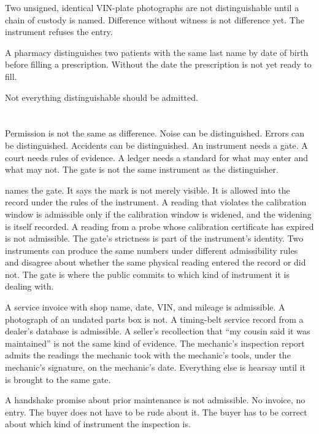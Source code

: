 Two unsigned, identical VIN-plate photographs are not distinguishable until
a chain of custody is named. Difference without witness is not difference
yet. The instrument refuses the entry.

A pharmacy distinguishes two patients with the same last name by date of
birth before filling a prescription. Without the date the prescription is
not yet ready to fill.

Not everything distinguishable should be admitted.

\section{}
\label{se:admissible}

Permission is not the same as difference. Noise can be distinguished. Errors
can be distinguished. Accidents can be distinguished. An instrument needs a
gate. A court needs rules of evidence. A ledger needs a standard for what
may enter and what may not. The gate is not the same instrument as the
distinguisher.

 names the gate. It says the mark is not merely visible. It
is allowed into the record under the rules of the instrument. A reading that
violates the calibration window is admissible only if the calibration window
is widened, and the widening is itself recorded. A reading from a probe
whose calibration certificate has expired is not admissible. The gate's
strictness is part of the instrument's identity. Two instruments can produce
the same numbers under different admissibility rules and disagree about
whether the same physical reading entered the record or did not. The gate is
where the public commits to which kind of instrument it is dealing with.

A service invoice with shop name, date, VIN, and mileage is admissible. A
photograph of an undated parts box is not. A timing-belt service record from
a dealer's database is admissible. A seller's recollection that ``my cousin
said it was maintained'' is not the same kind of evidence. The mechanic's
inspection report admits the readings the mechanic took with the mechanic's
tools, under the mechanic's signature, on the mechanic's date. Everything
else is hearsay until it is brought to the same gate.

A handshake promise about prior maintenance is not admissible. No invoice,
no entry. The buyer does not have to be rude about it. The buyer has to be
correct about which kind of instrument the inspection is.

